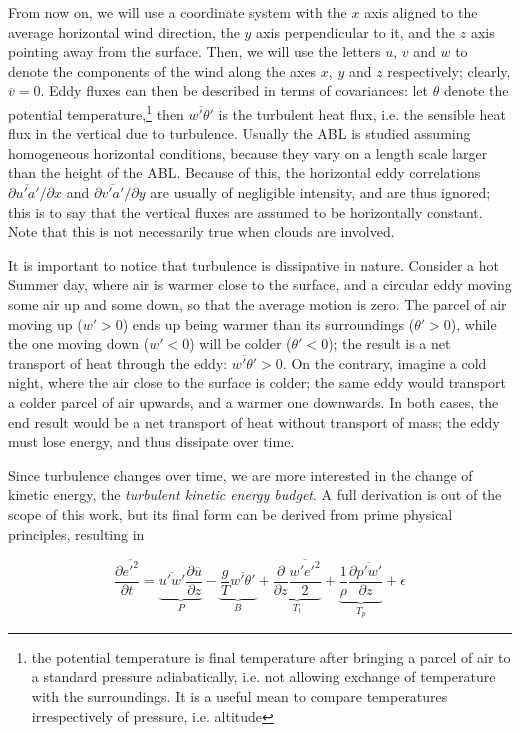 \documentclass[a4paper,11pt]{kth-mag}
\begin{document}
From now on, we will use a coordinate system with the $x$ axis aligned to the average horizontal wind direction, the $y$ axis perpendicular to it, and the $z$ axis pointing away from the surface. Then, we will use the letters $u$, $v$ and $w$ to denote the components of the wind along the axes $x$, $y$ and $z$ respectively; clearly, $\overline{v}=0$. Eddy fluxes can then be described in terms of covariances: let $\theta$ denote the potential temperature,\footnote{the potential temperature is final temperature after bringing a parcel of air to a standard pressure adiabatically, i.e. not allowing exchange of temperature with the surroundings. It is a useful mean to compare temperatures irrespectively of pressure, i.e. altitude} then $\overline{w'\theta'}$ is the turbulent heat flux, i.e. the sensible heat flux in the vertical due to turbulence. Usually the ABL is studied assuming homogeneous horizontal conditions, because they vary on a length scale larger than the height of the ABL. Because of this, the horizontal eddy correlations $\partial\overline{u'a'}/\partial x$ and $\partial\overline{v'a'}/\partial y$ are usually of negligible intensity, and are thus ignored; this is to say that the vertical fluxes are assumed to be horizontally constant. Note that this is not necessarily true when clouds are involved.

It is important to notice that turbulence is dissipative in nature. Consider a hot Summer day, where air is warmer close to the surface, and a circular eddy moving some air up and some down, so that the average motion is zero. The parcel of air moving up ($w'>0$) ends up being warmer than its surroundings ($\theta'>0$), while the one moving down ($w'<0$) will be colder ($\theta'<0$); the result is a net transport of heat through the eddy: $\overline{w'\theta'}>0$. On the contrary, imagine a cold night, where the air close to the surface is colder; the same eddy would transport a colder parcel of air upwards, and a warmer one downwards. In both cases, the end result would be a net transport of heat without transport of mass; the eddy must lose energy, and thus dissipate over time.

Since turbulence changes over time, we are more interested in the change of kinetic energy, the \emph{turbulent kinetic energy budget}. A full derivation is out of the scope of this work, but its final form \citep{basicatm} can be derived from prime physical principles, resulting in

\begin{equation}
\frac{\partial\overline{{e'}^2}}{\partial t}
=\underbrace{\overline{u'w'}\frac{\partial\overline{u}}{\partial z}}_P
-\underbrace{\frac{g}{T}\overline{w'\theta'}}_B
+\underbrace{\frac{\partial}{\partial z}\frac{\overline{w'{e'}^2}}{2}}_{T_t}
+\underbrace{\frac{1}{\rho}\frac{\partial\overline{p'w'}}{\partial z}}_{T_p}
+\epsilon
\end{equation}
\end{document}
